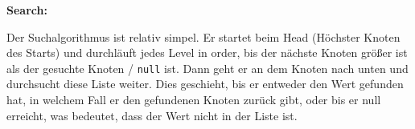 \documentclass[
../AuD-Zusammenfassung.tex,
]
{subfiles}
\begin{document}
\textbf{Search:}

Der Suchalgorithmus ist relativ simpel. Er startet beim Head (Höchster Knoten des Starts) und durchläuft jedes Level in order, bis der nächste Knoten größer ist als der gesuchte Knoten / \texttt{null} ist. Dann geht er an dem Knoten nach unten und durchsucht diese Liste weiter. Dies geschieht, bis er entweder den Wert gefunden hat, in welchem Fall er den gefundenen Knoten zurück gibt, oder bis er null erreicht, was bedeutet, dass der Wert nicht in der Liste ist. 

\begin{algorithm}[H]
\end{algorithm}
\end{document}
